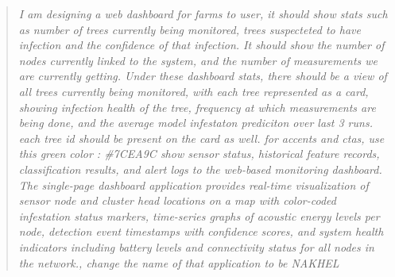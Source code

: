 \documentclass[12pt,a4paper,oneside]{memoir}
\begin{document}
\begin{quote}
\textit{I am designing a web dashboard for farms to user, it should show stats such as number of trees currently being monitored, trees suspecteted to have infection and the confidence of that infection. It should show the number of nodes currently linked to the system, and the number of measurements we are currently getting. Under these dashboard stats, there should be a view of all trees currently being monitored, with each tree represented as a card, showing infection health of the tree, frequency at which measurements are being done, and the average model infestaton prediciton over last 3 runs. each tree id should be present on the card as well. for accents and ctas, use this green color : \#7CEA9C show  sensor status, historical feature records, classification results, and alert logs to the web-based monitoring dashboard. The single-page dashboard application provides real-time visualization of sensor node and cluster head locations on a map with color-coded infestation status markers, time-series graphs of acoustic energy levels per node, detection event timestamps with confidence scores, and system health indicators including battery levels and connectivity status for all nodes in the network., change the name of that application to be NAKHEL}
\end{quote}
\endgroup



\end{document}
